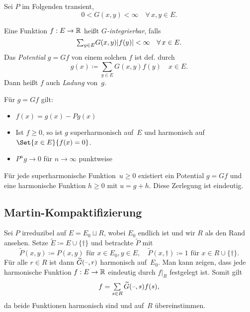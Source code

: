 \documentclass{cheat-sheet}
\begin{document}
Sei $P$ im Folgenden transient, \dh{}
\[
  0 < G(x, y) < \infty \quad
  \forall \, x, y \in E.
\]

\begin{defn}
  Eine Funktion $f : E \to \mathbb{R}$ heißt \emph{$G$-integrierbar}, falls
  \[
    {\sum}_{y \in E} G(x, y) \abs{f(y)} < \infty \quad
    \forall \, x \in E.
  \]
  Das \emph{Potential} $g = Gf$ von einem solchen $f$ ist def. durch
  \[
    g(x) \coloneqq {\sum}_{y \in E} G(x, y) f(y) \quad x \in E.
  \]
  Dann heißt $f$ auch \emph{Ladung} von~$g$.
\end{defn}

\begin{lem}
  Für $g = G f$ gilt:
  \begin{itemize}
    \item $f(x) = g(x) - P g(x)$
    \item Ist $f \geq 0$, so ist $g$ superharmonisch auf~$E$ und harmonisch auf $\Set{x \in E}{f(x) = 0}$.
    \item $P^n g \to 0$ für $n \to \infty$ punktweise
  \end{itemize}
\end{lem}

\begin{satz}
  Für jede superharmonische Funktion~$u \geq 0$ existiert ein Potential $g = G f$ und eine harmonische Funktion $h \geq 0$ mit $u = g + h$.
  Diese Zerlegung ist eindeutig.
\end{satz}

\subsection{Martin-Kompaktifizierung}

\begin{bsp}
  Sei $P$ irreduzibel auf $E = E_0 \sqcup R$, wobei $E_0$ endlich ist und wir $R$ als den Rand ansehen.
  Setze $\widetilde{E} \coloneqq E \cup \{ \dagger \}$ und betrachte $\widetilde{P}$ mit
  \[
    \widetilde{P}(x, y) \coloneqq P(x, y) \text{ für } x \in E_0, y \in E, \quad
    \widetilde{P}(x, \dagger) \coloneqq 1 \text{ für } x \in R \cup \{ \dagger \}.
  \]
  Für alle $r \in R$ ist dann $\widetilde{G}(\text{--}, r)$ harmonisch auf~$E_0$.
  Man kann zeigen, dass jede harmonische Funktion $f : E \to \mathbb{R}$ eindeutig durch $f|_R$ festgelegt ist.
  Somit gilt
  \[
    f = \sum_{s \in R} \widetilde{G}(\blank, s) f(s),
  \]
  da beide Funktionen harmonisch sind und auf~$R$ übereinstimmen.
\end{bsp}
\end{document}
